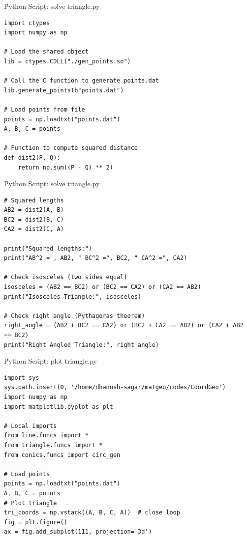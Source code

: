 \documentclass{beamer}
\numberwithin{equation}{section}
\theoremstyle{remark}
\begin{document}
\begin{frame}[fragile]{Python Script: solve triangle.py}
\begin{verbatim}
import ctypes
import numpy as np

# Load the shared object
lib = ctypes.CDLL("./gen_points.so")

# Call the C function to generate points.dat
lib.generate_points(b"points.dat")

# Load points from file
points = np.loadtxt("points.dat")
A, B, C = points

# Function to compute squared distance
def dist2(P, Q):
    return np.sum((P - Q) ** 2)
    \end{verbatim}
\end{frame}

\begin{frame}[fragile]{Python Script: solve triangle.py}
\begin{verbatim}
# Squared lengths
AB2 = dist2(A, B)
BC2 = dist2(B, C)
CA2 = dist2(C, A)

print("Squared lengths:")
print("AB^2 =", AB2, " BC^2 =", BC2, " CA^2 =", CA2)

# Check isosceles (two sides equal)
isosceles = (AB2 == BC2) or (BC2 == CA2) or (CA2 == AB2)
print("Isosceles Triangle:", isosceles)

# Check right angle (Pythagoras theorem)
right_angle = (AB2 + BC2 == CA2) or (BC2 + CA2 == AB2) or (CA2 + AB2 == BC2)
print("Right Angled Triangle:", right_angle)
\end{verbatim}
\end{frame}

\begin{frame}[fragile]{Python Script: plot triangle.py}
\begin{verbatim}
import sys
sys.path.insert(0, '/home/dhanush-sagar/matgeo/codes/CoordGeo')
import numpy as np
import matplotlib.pyplot as plt

# Local imports
from line.funcs import *
from triangle.funcs import *
from conics.funcs import circ_gen

# Load points
points = np.loadtxt("points.dat")
A, B, C = points
# Plot triangle
tri_coords = np.vstack((A, B, C, A))  # close loop
fig = plt.figure()
ax = fig.add_subplot(111, projection='3d')
\end{verbatim}
\end{frame}
\end{document}
